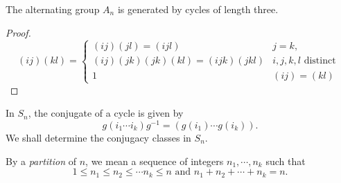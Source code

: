 \begin{corollary}
  \label{corollary-alternating-group-generated-by-3-cycles}
  The alternating group \( A_n \) is generated by cycles of length three.
\end{corollary}
\begin{proof}
  \[
    (ij)(kl) = \begin{cases}
      (ij) (jl) = (ijl) & j = k,\\
      (ij)(jk)(jk)(kl) = (ijk)(jkl) & i,j,k,l \text{ distinct }\\
      1 & (ij) = (kl)
    \end{cases}
  \]
\end{proof}


In \( S_n \), the conjugate of a cycle is given by
\[
  g(i_1 \cdots i_k)g^{-1} = (g(i_1) \cdots g(i_k)).
\]
We shall determine the conjugacy classes in \( S_n \).

\begin{definition}
  \label{definition-number-partition}
  By a \emph{partition} of \( n \), we mean a sequence of integers \( n_1, \cdots, n_k \) such that
  \[
    1 \leq n_1 \leq n_2 \leq \cdots n_k \leq n \text{ and } n_1 + n_2 + \cdots + n_k = n.
  \]
\end{definition}

